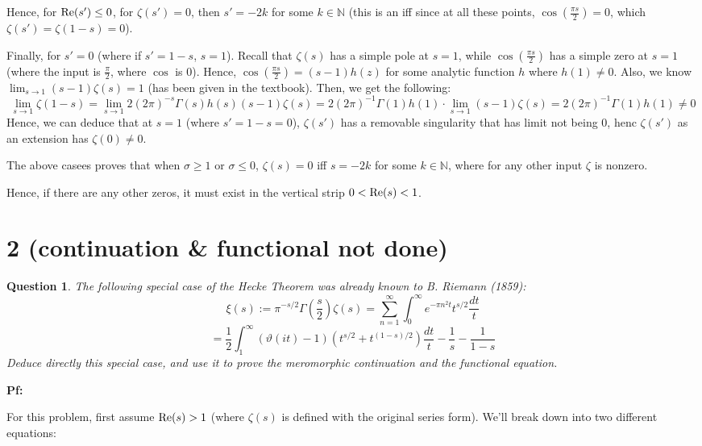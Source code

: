 \documentclass{article}
\newtheorem{question}{Question}
\begin{document}
Hence, for $\textmd{Re}(s')\leq 0$, for $\zeta(s')=0$, then $s' = -2k$ for some $k\in\mathbb{N}$ (this is an iff since at all these points, $\cos(\frac{\pi s}{2})=0$, which $\zeta(s')=\zeta(1-s)=0$).

\hfil

Finally, for $s'=0$ (where if $s'=1-s$, $s=1$). Recall that $\zeta(s)$ has a simple pole at $s=1$, while $\cos(\frac{\pi s}{2})$ has a simple zero at $s=1$ (where the input is $\frac{\pi}{2}$, where $\cos$ is $0$). Hence, $\cos(\frac{\pi s}{2}) = (s-1)h(z)$ for some analytic function $h$ where $h(1)\neq 0$. Also, we know $\lim_{s\rightarrow 1}(s-1)\zeta(s) = 1$ (has been given in the textbook). Then, we get the following:
$$\lim_{s\rightarrow 1}\zeta(1-s) = \lim_{s\rightarrow 1}2(2\pi)^{-s}\Gamma(s)h(s)(s-1)\zeta(s) = 2(2\pi)^{-1}\Gamma(1)h(1)\cdot \lim_{s\rightarrow 1}(s-1)\zeta(s) = 2(2\pi)^{-1}\Gamma(1)h(1)\neq 0$$
Hence, we can deduce that at $s=1$ (where $s'=1-s=0$), $\zeta(s')$ has a removable singularity that has limit not being $0$, henc $\zeta(s')$ as an extension has $\zeta(0)\neq 0$.

\hfil

The above casees proves that when $\sigma\geq 1$ or $\sigma\leq 0$, $\zeta(s)=0$ iff $s=-2k$ for some $k\in\mathbb{N}$, where for any other input $\zeta$ is nonzero.

Hence, if there are any other zeros, it must exist in the vertical strip $0<\textmd{Re}(s)<1$.

\break

\section*{2 (continuation \& functional not done)}
\begin{myBox}[]{}
    \begin{question}
        The following special case of the Hecke Theorem was already known to B. Riemann (1859):
        $$\xi(s):=\pi ^{-s/2}\Gamma\left(\frac{s}{2}\right)\zeta(s)=\sum_{n=1}^{\infty}\int_{0}^{\infty}e^{-\pi n^2t}t^{s/2}\frac{dt}{t}$$
        $$=\frac{1}{2}\int_{1}^{\infty}(\vartheta(it)-1)(t^{s/2}+t^{(1-s)/2})\frac{dt}{t}-\frac{1}{s}-\frac{1}{1-s}$$
        Deduce directly this special case, and use it to prove the meromorphic continuation and the functional equation.
    \end{question}
\end{myBox}

\textbf{Pf:}

For this problem, first assume $\textmd{Re}(s)>1$ (where $\zeta(s)$ is defined with the original series form). We'll break down into two different equations:
\end{document}

